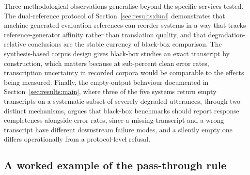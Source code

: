 Three methodological observations generalise beyond the specific services
tested. The dual-reference protocol of Section~\ref{sec:results:dual}
demonstrates that machine-generated evaluation references can reorder
systems in a way that tracks reference-generator affinity rather than
translation quality, and that degradation-relative conclusions are the
stable currency of black-box comparison. The synthesis-based corpus design
gives black-box studies an exact transcript by construction, which matters
because at sub-percent clean error rates, transcription uncertainty in
recorded corpora would be comparable to the effects being measured. Finally,
the empty-output behaviour documented in Section~\ref{sec:results:main},
where three of the five systems return empty transcripts on a systematic
subset of severely degraded utterances, through two distinct mechanisms,
argues that black-box benchmarks should report response completeness
alongside error rates, since a missing transcript and a wrong transcript
have different downstream failure modes, and a silently empty one differs
operationally from a protocol-level refusal.

\subsection{A worked example of the pass-through rule}

